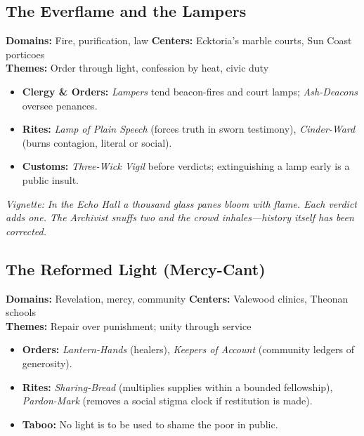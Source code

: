 \subsection*{The Everflame and the Lampers}
\textbf{Domains:} Fire, purification, law \quad
\textbf{Centers:} Ecktoria's marble courts, Sun Coast porticoes \\
\textbf{Themes:} Order through light, confession by heat, civic duty
\begin{itemize}
  \item \textbf{Clergy \& Orders:} \emph{Lampers} tend beacon-fires and court lamps; \emph{Ash-Deacons} oversee penances. 
  \item \textbf{Rites:} \emph{Lamp of Plain Speech} (forces truth in sworn testimony), \emph{Cinder-Ward} (burns contagion, literal or social).
  \item \textbf{Customs:} \emph{Three-Wick Vigil} before verdicts; extinguishing a lamp early is a public insult. 
\end{itemize}
\emph{Vignette:} \textit{In the Echo Hall a thousand glass panes bloom with flame. Each verdict adds one. The Archivist snuffs two and the crowd inhales—history itself has been corrected.}

\subsection*{The Reformed Light (Mercy-Cant)}
\textbf{Domains:} Revelation, mercy, community \quad
\textbf{Centers:} Valewood clinics, Theonan schools \\
\textbf{Themes:} Repair over punishment; unity through service
\begin{itemize}
  \item \textbf{Orders:} \emph{Lantern-Hands} (healers), \emph{Keepers of Account} (community ledgers of generosity). 
  \item \textbf{Rites:} \emph{Sharing-Bread} (multiplies supplies within a bounded fellowship), \emph{Pardon-Mark} (removes a social stigma clock if restitution is made).
  \item \textbf{Taboo:} No light is to be used to shame the poor in public.
\end{itemize}

